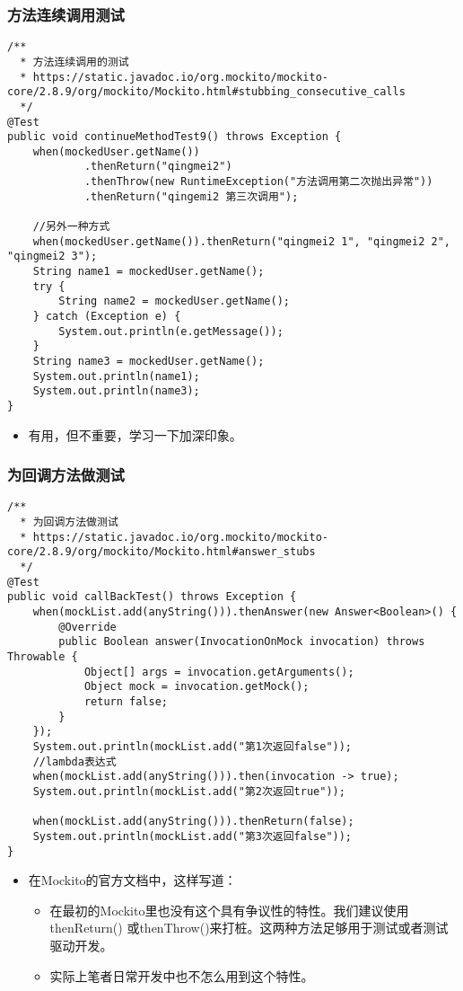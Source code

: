 \documentclass[9pt, b5paper]{article}
\begin{document}
\subsubsection{方法连续调用测试}
\label{sec-1-1-11}
\begin{verbatim}
/**
  * 方法连续调用的测试
  * https://static.javadoc.io/org.mockito/mockito-core/2.8.9/org/mockito/Mockito.html#stubbing_consecutive_calls
  */
@Test
public void continueMethodTest9() throws Exception {
    when(mockedUser.getName())
            .thenReturn("qingmei2")
            .thenThrow(new RuntimeException("方法调用第二次抛出异常"))
            .thenReturn("qingemi2 第三次调用");

    //另外一种方式
    when(mockedUser.getName()).thenReturn("qingmei2 1", "qingmei2 2", "qingmei2 3");
    String name1 = mockedUser.getName();
    try {
        String name2 = mockedUser.getName();
    } catch (Exception e) {
        System.out.println(e.getMessage());
    }
    String name3 = mockedUser.getName();
    System.out.println(name1);
    System.out.println(name3);
}
\end{verbatim}
\begin{itemize}
\item 有用，但不重要，学习一下加深印象。
\end{itemize}
\subsubsection{为回调方法做测试}
\label{sec-1-1-12}
\begin{verbatim}
/**
  * 为回调方法做测试
  * https://static.javadoc.io/org.mockito/mockito-core/2.8.9/org/mockito/Mockito.html#answer_stubs
  */
@Test
public void callBackTest() throws Exception {
    when(mockList.add(anyString())).thenAnswer(new Answer<Boolean>() {
        @Override
        public Boolean answer(InvocationOnMock invocation) throws Throwable {
            Object[] args = invocation.getArguments();
            Object mock = invocation.getMock();
            return false;
        }
    });
    System.out.println(mockList.add("第1次返回false"));
    //lambda表达式
    when(mockList.add(anyString())).then(invocation -> true);
    System.out.println(mockList.add("第2次返回true"));

    when(mockList.add(anyString())).thenReturn(false);
    System.out.println(mockList.add("第3次返回false"));
}
\end{verbatim}
\begin{itemize}
\item 在Mockito的官方文档中，这样写道：
\begin{itemize}
\item 在最初的Mockito里也没有这个具有争议性的特性。我们建议使用thenReturn() 或thenThrow()来打桩。这两种方法足够用于测试或者测试驱动开发。
\item 实际上笔者日常开发中也不怎么用到这个特性。
\end{itemize}
\end{itemize}
\end{document}
